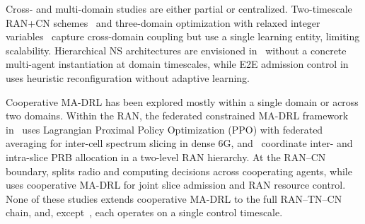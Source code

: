 \documentclass[12pt,lettersize,journal,onecolumn]{IEEEtran}
\begin{document}
Cross- and multi-domain studies are either partial or centralized. Two-timescale RAN+CN schemes~\cite{jstsp21reyhanian} and three-domain optimization with relaxed integer variables~\cite{tnse25nouruzi} capture cross-domain coupling but use a single learning entity, limiting scalability. Hierarchical NS architectures are envisioned in~\cite{mnet23liu} without a concrete multi-agent instantiation at domain timescales, while E2E admission control in~\cite{tnsm22luu} uses heuristic reconfiguration without adaptive learning. %

Cooperative MA-DRL has been explored mostly within a single domain or across two domains. Within the RAN, the federated constrained MA-DRL framework in~\cite{dyspan26mohammadi} uses Lagrangian Proximal Policy Optimization (PPO) with federated averaging for inter-cell spectrum slicing in dense 6G, and~\cite{jsac24zangooei,jiot24filali} coordinate inter- and intra-slice PRB allocation in a two-level RAN hierarchy. At the RAN--CN boundary, \cite{access21kim} splits radio and computing decisions across cooperating agents, while~\cite{tnsm22sulaiman} uses cooperative MA-DRL for joint slice admission and RAN resource control. None of these studies extends cooperative MA-DRL to the full RAN--TN--CN chain, and, except~\cite{jsac24zangooei,jiot24filali}, each operates on a single control timescale.
\end{document}
